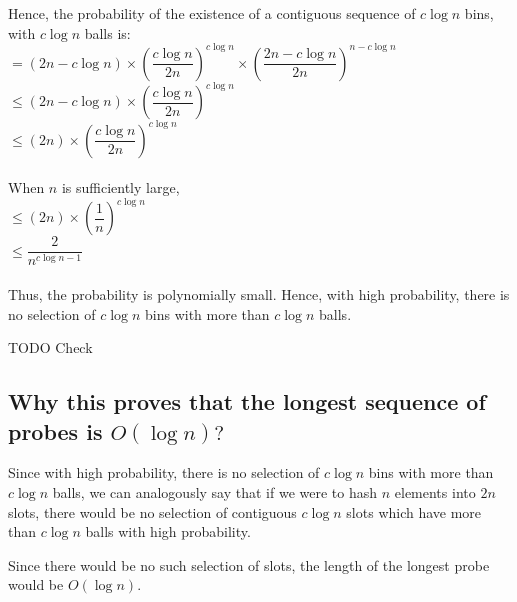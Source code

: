 \documentclass{article}
\begin{document}
Hence, the probability of the existence of a contiguous
sequence of $c\log{n}$ bins, with $c\log{n}$ balls is: \\
$ = (2n-c\log{n}) \times \left(\dfrac{c\log{n}}{2n}\right)^{c\log{n}} \times 
\left( \dfrac{2n-c\log{n}}{2n} \right) ^{n-c\log{n}}$ \\
$ \leq (2n-c\log{n}) \times \left(\dfrac{c\log{n}}{2n}\right)^{c\log{n}}$ \\
$ \leq (2n) \times \left( \dfrac{c\log{n}}{2n}\right)^{c\log{n}} $ \\
\\ When $n$ is sufficiently large, \\
$ \leq (2n) \times \left( \dfrac{1}{n} \right)^{c\log{n}}$ \\
$ \leq \dfrac{2}{n^{c\log{n}-1}} $ \\
\\ Thus, the probability is polynomially small. Hence, with high
probability, there is no selection of $c\log{n}$ bins with
more than $c\log{n}$ balls. 

TODO Check

\subsection{Why this proves that the longest sequence of probes
is $O(\log{n})?$}


Since with high probability, there is no selection of $c\log{n}$ bins
with more than $c\log{n}$ balls, we can analogously say that if we
were to hash $n$ elements into $2n$ slots, there would be no selection of contiguous $c\log{n}$ slots which have
more than $c\log{n}$ balls with high probability.

Since there would be no such selection of slots, the length of the
longest probe would be $O(\log{n})$.

\clearpage
\end{document}
